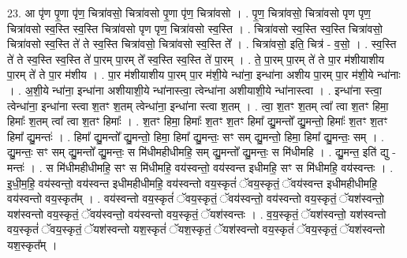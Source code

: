\documentclass[17pt]{extarticle}
\begin{document}
23. आ पृ॑ण पृ॒णा पृ॑ण॒ चित्रा॑वसो॒ चित्रा॑वसो पृ॒णा पृ॑ण॒ चित्रा॑वसो । . पृ॒ण॒ चित्रा॑वसो॒ चित्रा॑वसो पृण पृण॒ चित्रा॑वसो स्व॒स्ति स्व॒स्ति चित्रा॑वसो पृण पृण॒ चित्रा॑वसो स्व॒स्ति । . चित्रा॑वसो स्व॒स्ति स्व॒स्ति चित्रा॑वसो॒ चित्रा॑वसो स्व॒स्ति ते॑ ते स्व॒स्ति चित्रा॑वसो॒ चित्रा॑वसो स्व॒स्ति ते᳚ । . चित्रा॑वसो॒ इति॒ चित्र॑ - व॒सो॒ । . स्व॒स्ति ते॑ ते स्व॒स्ति स्व॒स्ति ते॑ पा॒रम् पा॒रम् ते᳚ स्व॒स्ति स्व॒स्ति ते॑ पा॒रम् । . ते॒ पा॒रम् पा॒रम् ते॑ ते पा॒र म॑शीयाशीय पा॒रम् ते॑ ते पा॒र म॑शीय । . पा॒र म॑शीयाशीय पा॒रम् पा॒र म॑शी॒ये न्धा॑ना॒ इन्धा॑ना अशीय पा॒रम् पा॒र म॑शी॒ये न्धा॑नाः । . अ॒शी॒ये न्धा॑ना॒ इन्धा॑ना अशीयाशी॒ये न्धा॑नास्त्वा॒ त्वेन्धा॑ना अशीयाशी॒ये न्धा॑नास्त्वा । . इन्धा॑ना स्त्वा॒ त्वेन्धा॑ना॒ इन्धा॑ना स्त्वा श॒तꣳ श॒तम् त्वेन्धा॑ना॒ इन्धा॑ना स्त्वा श॒तम् । . त्वा॒ श॒तꣳ श॒तम् त्वा᳚ त्वा श॒तꣳ हिमा॒ हिमाः᳚ श॒तम् त्वा᳚ त्वा श॒तꣳ हिमाः᳚ । . श॒तꣳ हिमा॒ हिमाः᳚ श॒तꣳ श॒तꣳ हिमा᳚ द्यु॒मन्तो᳚ द्यु॒मन्तो॒ हिमाः᳚ श॒तꣳ श॒तꣳ हिमा᳚ द्यु॒मन्तः॑ । . हिमा᳚ द्यु॒मन्तो᳚ द्यु॒मन्तो॒ हिमा॒ हिमा᳚ द्यु॒मन्तः॒ सꣳ सम् द्यु॒मन्तो॒ हिमा॒ हिमा᳚ द्यु॒मन्तः॒ सम् । . द्यु॒मन्तः॒ सꣳ सम् द्यु॒मन्तो᳚ द्यु॒मन्तः॒ स मि॑धीमहीधीमहि॒ सम् द्यु॒मन्तो᳚ द्यु॒मन्तः॒ स मि॑धीमहि । . द्यु॒मन्त॒ इति॑ द्यु - मन्तः॑ । . स मि॑धीमहीधीमहि॒ सꣳ स मि॑धीमहि॒ वय॑स्वन्तो॒ वय॑स्वन्त इधीमहि॒ सꣳ स मि॑धीमहि॒ वय॑स्वन्तः । . इ॒धी॒म॒हि॒ वय॑स्वन्तो॒ वय॑स्वन्त इधीमहीधीमहि॒ वय॑स्वन्तो वय॒स्कृतं॑ ॅवय॒स्कृतं॒ ॅवय॑स्वन्त इधीमहीधीमहि॒ वय॑स्वन्तो वय॒स्कृत᳚म् । . वय॑स्वन्तो वय॒स्कृतं॑ ॅवय॒स्कृतं॒ ॅवय॑स्वन्तो॒ वय॑स्वन्तो वय॒स्कृतं॒ ॅयश॑स्वन्तो॒ यश॑स्वन्तो वय॒स्कृतं॒ ॅवय॑स्वन्तो॒ वय॑स्वन्तो वय॒स्कृतं॒ ॅयश॑स्वन्तः । . व॒य॒स्कृतं॒ ॅयश॑स्वन्तो॒ यश॑स्वन्तो वय॒स्कृतं॑ ॅवय॒स्कृतं॒ ॅयश॑स्वन्तो यश॒स्कृतं॑ ॅयश॒स्कृतं॒ ॅयश॑स्वन्तो वय॒स्कृतं॑ ॅवय॒स्कृतं॒ ॅयश॑स्वन्तो यश॒स्कृत᳚म् । \newline
\end{document}
